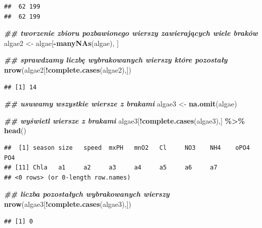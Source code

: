 \documentclass[
]{book}
\newenvironment{Shaded}{\begin{snugshade}}{\end{snugshade}}
\newcommand{\DocumentationTok}[1]{\textcolor[rgb]{0.56,0.35,0.01}{\textbf{\textit{#1}}}}
\newcommand{\FunctionTok}[1]{\textcolor[rgb]{0.13,0.29,0.53}{\textbf{#1}}}
\newcommand{\NormalTok}[1]{#1}
\newcommand{\OtherTok}[1]{\textcolor[rgb]{0.56,0.35,0.01}{#1}}
\newcommand{\SpecialCharTok}[1]{\textcolor[rgb]{0.81,0.36,0.00}{\textbf{#1}}}
\theoremstyle{plain}
\theoremstyle{definition}
\theoremstyle{definition}
\theoremstyle{definition}
\theoremstyle{definition}
\theoremstyle{definition}
\theoremstyle{remark}
\begin{document}
\begin{verbatim}
##  62 199 
##  62 199
\end{verbatim}

\begin{Shaded}
\begin{Highlighting}[]
\DocumentationTok{\#\# tworzenie zbioru pozbawionego wierszy zawierających wiele braków}
\NormalTok{algae2 }\OtherTok{\textless{}{-}}\NormalTok{ algae[}\SpecialCharTok{{-}}\FunctionTok{manyNAs}\NormalTok{(algae), ]}

\DocumentationTok{\#\# sprawdzamy liczbę wybrakowanych wierszy które pozostały}
\FunctionTok{nrow}\NormalTok{(algae2[}\SpecialCharTok{!}\FunctionTok{complete.cases}\NormalTok{(algae2),])}
\end{Highlighting}
\end{Shaded}

\begin{verbatim}
## [1] 14
\end{verbatim}

\begin{Shaded}
\begin{Highlighting}[]
\DocumentationTok{\#\# usuwamy wszystkie wiersze z brakami}
\NormalTok{algae3 }\OtherTok{\textless{}{-}} \FunctionTok{na.omit}\NormalTok{(algae)}
    
\DocumentationTok{\#\# wyświetl wiersze z brakami}
\NormalTok{algae3[}\SpecialCharTok{!}\FunctionTok{complete.cases}\NormalTok{(algae3),] }\SpecialCharTok{\%\textgreater{}\%} \FunctionTok{head}\NormalTok{()}
\end{Highlighting}
\end{Shaded}

\begin{verbatim}
##  [1] season size   speed  mxPH   mnO2   Cl     NO3    NH4    oPO4   PO4   
## [11] Chla   a1     a2     a3     a4     a5     a6     a7    
## <0 rows> (or 0-length row.names)
\end{verbatim}

\begin{Shaded}
\begin{Highlighting}[]
\DocumentationTok{\#\# liczba pozostałych wybrakowanych wierszy}
\FunctionTok{nrow}\NormalTok{(algae3[}\SpecialCharTok{!}\FunctionTok{complete.cases}\NormalTok{(algae3),])}
\end{Highlighting}
\end{Shaded}

\begin{verbatim}
## [1] 0
\end{verbatim}
\end{document}
